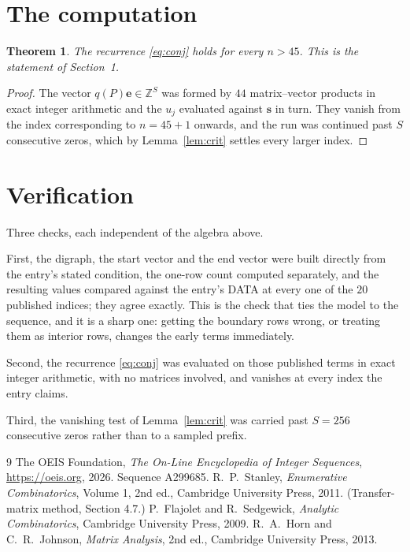 \documentclass[11pt,a4paper]{article}
\theoremstyle{plain}
\newtheorem{theorem}{Theorem}
\theoremstyle{definition}
\begin{document}
\section{The computation}

\begin{theorem}
The recurrence \eqref{eq:conj} holds for every $n>45$. This is the statement of
Section~1.
\end{theorem}

\begin{proof}
The vector $q(P)\mathbf{e}\in\mathbb{Z}^{S}$ was formed by $44$ matrix--vector
products in exact integer arithmetic and the $u_j$ evaluated against $\mathbf{s}$ in turn.
They vanish from the index corresponding to $n=45+1$ onwards, and the run was continued
past $S$ consecutive zeros, which by Lemma~\ref{lem:crit} settles every larger index.
\end{proof}

\section{Verification}

Three checks, each independent of the algebra above.

First, the digraph, the start vector and the end vector were built directly from the
entry's stated condition, the one-row count computed separately, and the resulting values
compared against the entry's DATA at every one of the $20$ published indices; they
agree exactly. This is the check that ties the model to the sequence, and it is a sharp one:
getting the boundary rows wrong, or treating them as interior rows, changes the early terms
immediately.

Second, the recurrence \eqref{eq:conj} was evaluated on those published terms in exact
integer arithmetic, with no matrices involved, and vanishes at every index the entry claims.

Third, the vanishing test of Lemma~\ref{lem:crit} was carried past $S=256$ consecutive
zeros rather than to a sampled prefix.

\begin{thebibliography}{9}
 The OEIS Foundation, \emph{The On-Line Encyclopedia of Integer
Sequences}, \url{https://oeis.org}, 2026. Sequence A299685.
 R.~P.~Stanley, \emph{Enumerative Combinatorics}, Volume 1, 2nd ed.,
Cambridge University Press, 2011. (Transfer-matrix method, Section 4.7.)
 P.~Flajolet and R.~Sedgewick, \emph{Analytic Combinatorics}, Cambridge
University Press, 2009.
 R.~A.~Horn and C.~R.~Johnson, \emph{Matrix Analysis}, 2nd ed., Cambridge
University Press, 2013.
\end{thebibliography}
\end{document}
